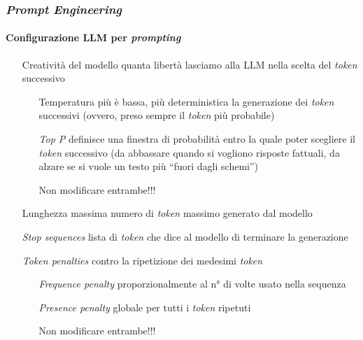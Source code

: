 \begin{frame}[t] \frametitle{\emph{Prompt Engineering}}
\framesubtitle{Configurazione LLM per \emph{prompting}}
{\scriptsize
    \begin{minipage}[t]{\textwidth}
        \begin{itemize}[leftmargin=60pt,align=right]
            \item[\alert{Creatività del modello}] quanta libertà lasciamo alla LLM nella scelta del \emph{token} successivo
            \begin{itemize}[leftmargin=45pt,align=right]
            \item[\alert{Temperatura}] più è bassa, più deterministica la generazione dei \emph{token} successivi (ovvero, preso sempre il \emph{token} più probabile)
            \item[\alert{\emph{Top P}}] definisce una finestra di probabilità entro la quale poter scegliere il \emph{token} successivo (da abbassare quando si vogliono risposte fattuali, da alzare se si vuole un testo più ``fuori dagli schemi'')
            \item[\alert{\faExclamationTriangle}] Non modificare entrambe!!!
            \end{itemize}
            \item[\alert{Lunghezza massima}] numero di \emph{token} massimo generato dal modello
            \item[\alert{\emph{Stop sequences}}] lista di \emph{token} che dice al modello di terminare la generazione
            \item[\alert{\emph{Token penalties}}] contro la ripetizione dei medesimi \emph{token}
            \begin{itemize}[leftmargin=63pt,align=right]
                \item[\alert{\emph{Frequence penalty}}] proporzionalmente al n° di volte usato nella sequenza
                \item[\alert{\emph{Presence penalty}}] globale per tutti i \emph{token} ripetuti
                \item[\alert{\faExclamationTriangle}] Non modificare entrambe!!!
            \end{itemize}
        \end{itemize}
    \end{minipage}
}
\end{frame}
%
